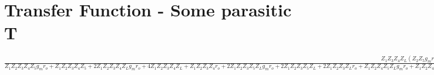 \documentclass{article}
\begin{document}
\section*{Transfer Function - Some parasitic T}
\(
\frac{Z_{1} Z_{3} Z_{4} Z_{L} \left(Z_{2} Z_{5} g_{m} r_{o} + Z_{2} Z_{5} - Z_{2} r_{o} + Z_{5} r_{o}\right)}{Z_{1} Z_{2} Z_{3} Z_{4} Z_{5} g_{m} r_{o} + Z_{1} Z_{2} Z_{3} Z_{4} Z_{5} + 2 Z_{1} Z_{2} Z_{3} Z_{4} Z_{L} g_{m} r_{o} + 4 Z_{1} Z_{2} Z_{3} Z_{4} Z_{L} + Z_{1} Z_{2} Z_{3} Z_{4} r_{o} + 2 Z_{1} Z_{2} Z_{3} Z_{5} Z_{L} g_{m} r_{o} + 2 Z_{1} Z_{2} Z_{3} Z_{5} Z_{L} + 2 Z_{1} Z_{2} Z_{3} Z_{L} r_{o} + Z_{1} Z_{2} Z_{4} Z_{5} Z_{L} g_{m} r_{o} + Z_{1} Z_{2} Z_{4} Z_{5} Z_{L} + Z_{1} Z_{2} Z_{4} Z_{L} r_{o} + Z_{1} Z_{3} Z_{4} Z_{5} r_{o} + 4 Z_{1} Z_{3} Z_{4} Z_{L} r_{o} + 2 Z_{1} Z_{3} Z_{5} Z_{L} r_{o} + Z_{1} Z_{4} Z_{5} Z_{L} r_{o} + Z_{2} Z_{3} Z_{4} Z_{5} Z_{L} + Z_{2} Z_{3} Z_{4} Z_{5} r_{o} + Z_{2} Z_{3} Z_{4} Z_{L} r_{o} + 2 Z_{2} Z_{3} Z_{5} Z_{L} r_{o} + Z_{2} Z_{4} Z_{5} Z_{L} r_{o} + Z_{3} Z_{4} Z_{5} Z_{L} r_{o}}
\)
\end{document}
